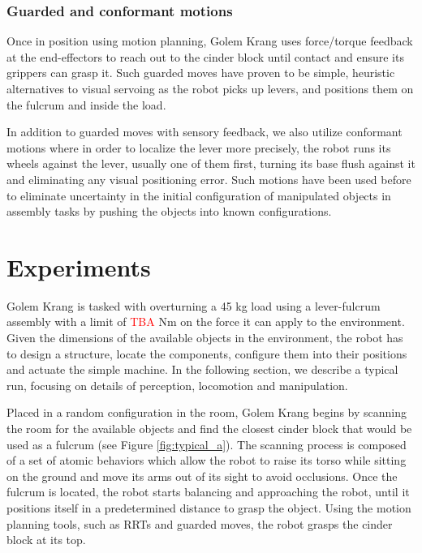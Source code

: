 \documentclass[runningheads,a4paper]{llncs}
\begin{document}
\vspace{-2em}
\subsubsection{Guarded and conformant motions}

Once in position using motion planning, Golem Krang uses force/torque feedback at the end-effectors
to reach out to the cinder block until contact and ensure its grippers can grasp it. Such guarded
moves have proven to be simple, heuristic alternatives to visual servoing as the robot picks up
levers, and positions them on the fulcrum and inside the load.

In addition to guarded moves with sensory feedback, we also utilize conformant motions where
in order to localize the lever more precisely, the robot runs its wheels against the lever,
usually one of them first, turning its base flush against it and eliminating any visual positioning error.
Such motions have been used before to eliminate uncertainty in the initial configuration of manipulated
objects in assembly tasks by pushing the objects into known configurations. \cite{mason1986mechanics}

\section{Experiments}

Golem Krang is tasked with overturning a 45 kg load using a lever-fulcrum assembly with a limit of
\textcolor{red}{TBA} Nm on the force it can apply to the environment. Given the dimensions of the 
available objects in the environment, the robot has to design a structure, locate the components,
configure them into their positions and actuate the simple machine. In the following section, we
describe a typical run, focusing on details of perception, locomotion and manipulation.

Placed in a random configuration in the room, Golem Krang begins by scanning the room for the 
available objects and find the closest cinder block that would be used as a fulcrum (see Figure \ref{fig:typical_a}).
The scanning process is composed of a set of atomic behaviors which allow the robot to raise
its torso while sitting on the ground and move its arms out of its sight to avoid occlusions.
Once the fulcrum is located, the robot starts balancing and approaching the robot, until it 
positions itself in a predetermined distance to grasp the object. Using the motion planning tools,
such as RRTs and guarded moves, the robot grasps the cinder block at its top.
\end{document}
